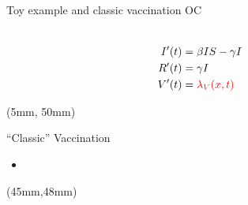 \begin{frame}{Toy example and classic vaccination OC}
\begin{textblock*}{65mm}
{\begin{equation*}
\begin{aligned}
                    \\
                    I'(t) &=  \beta IS - \gamma I
                    \\
                    R'(t) & = \gamma I
                    \\
                    V'(t) & = \textcolor{red}{\lambda_V(x,t)}
                \end{aligned}
            \end{equation*}
        }
    \end{textblock*}
    \begin{textblock*}{28mm}(5mm, 50mm)
        \begin{block}{``Classic'' Vaccination}
            \begin{itemize}
                \item

            \end{itemize}
        \end{block}
    \end{textblock*}
    \begin{textblock*}{80mm}(45mm,48mm)
    \end{textblock*}
 \end{frame}
